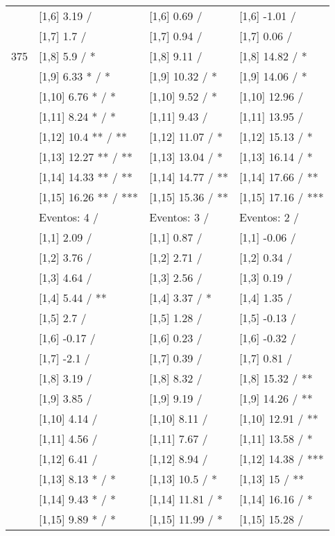 \begin{table}
\begin{tabular}[t]{llll}
 & {}[1,6] 3.19  / & {}[1,6] 0.69  / & {}[1,6] -1.01  /\\
 & {}[1,7] 1.7  / & {}[1,7] 0.94  / & {}[1,7] 0.06  /\\
375 & {}[1,8] 5.9  / * & {}[1,8] 9.11  / & {}[1,8] 14.82  / *\\
\addlinespace
 & {}[1,9] 6.33 * / * & {}[1,9] 10.32  / * & {}[1,9] 14.06  / *\\
 & {}[1,10] 6.76 * / * & {}[1,10] 9.52  / * & {}[1,10] 12.96  /\\
 & {}[1,11] 8.24 * / * & {}[1,11] 9.43  / & {}[1,11] 13.95  /\\
 & {}[1,12] 10.4 ** / ** & {}[1,12] 11.07  / * & {}[1,12] 15.13  / *\\
 & {}[1,13] 12.27 ** / ** & {}[1,13] 13.04  / * & {}[1,13] 16.14  / *\\
\addlinespace
 & {}[1,14] 14.33 ** / ** & {}[1,14] 14.77  / ** & {}[1,14] 17.66  / **\\
 & {}[1,15] 16.26 ** / *** & {}[1,15] 15.36  / ** & {}[1,15] 17.16  / ***\\
 & Eventos:  4 / & Eventos:  3 / & Eventos:  2 /\\
 & {}[1,1] 2.09  / & {}[1,1] 0.87  / & {}[1,1] -0.06  /\\
 & {}[1,2] 3.76  / & {}[1,2] 2.71  / & {}[1,2] 0.34  /\\
\addlinespace
 & {}[1,3] 4.64  / & {}[1,3] 2.56  / & {}[1,3] 0.19  /\\
 & {}[1,4] 5.44  / ** & {}[1,4] 3.37  / * & {}[1,4] 1.35  /\\
 & {}[1,5] 2.7  / & {}[1,5] 1.28  / & {}[1,5] -0.13  /\\
 & {}[1,6] -0.17  / & {}[1,6] 0.23  / & {}[1,6] -0.32  /\\
 & {}[1,7] -2.1  / & {}[1,7] 0.39  / & {}[1,7] 0.81  /\\
\addlinespace
500 & {}[1,8] 3.19  / & {}[1,8] 8.32  / & {}[1,8] 15.32  / **\\
 & {}[1,9] 3.85  / & {}[1,9] 9.19  / & {}[1,9] 14.26  / **\\
 & {}[1,10] 4.14  / & {}[1,10] 8.11  / & {}[1,10] 12.91  / **\\
 & {}[1,11] 4.56  / & {}[1,11] 7.67  / & {}[1,11] 13.58  / *\\
 & {}[1,12] 6.41  / & {}[1,12] 8.94  / & {}[1,12] 14.38  / ***\\
\addlinespace
 & {}[1,13] 8.13 * / * & {}[1,13] 10.5  / * & {}[1,13] 15  / **\\
 & {}[1,14] 9.43 * / * & {}[1,14] 11.81  / * & {}[1,14] 16.16  / *\\
 & {}[1,15] 9.89 * / * & {}[1,15] 11.99  / * & {}[1,15] 15.28  /\\
\bottomrule
\end{tabular}
\end{table}
